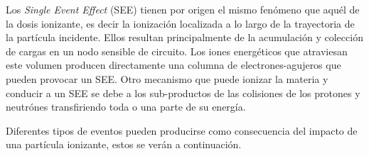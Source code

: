 Los \textit{Single Event Effect} (SEE) tienen por origen el mismo fenómeno que aquél de la dosis ionizante, es decir la ionización localizada a lo largo de la trayectoria de la partícula incidente. Ellos resultan principalmente de la acumulación y  colección de cargas en un nodo sensible de circuito. Los iones energéticos que atraviesan este volumen producen directamente una columna de electrones-agujeros que pueden provocar un SEE. Otro mecanismo que puede ionizar la materia y conducir a un SEE se debe a los sub-productos de las colisiones de los protones y  neutrónes transfiriendo toda o una parte de su energía.

Diferentes tipos de eventos pueden producirse como consecuencia del impacto de una partícula ionizante, estos se verán a continuación.